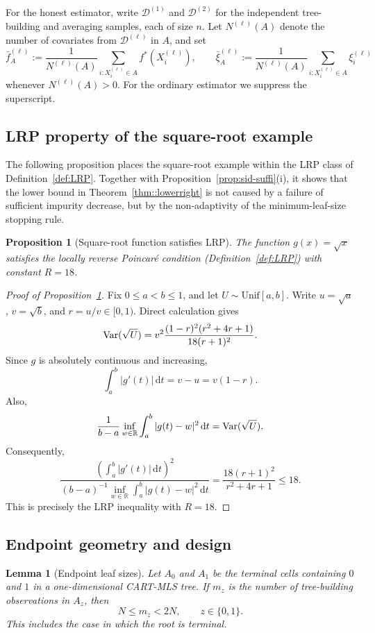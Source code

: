 \documentclass[11pt]{article}
\theoremstyle{plain}
\newtheorem{lemma}[theorem]{Lemma}
\newtheorem{proposition}[theorem]{Proposition}
\theoremstyle{definition}
\theoremstyle{remark}
\theoremstyle{plain}
\newcommand{\Var}{\textnormal{Var}}
\newcommand{\1}{\mathbbm{1}}
\begin{document}
For the honest estimator, write $\mathcal D^{(1)}$ and $\mathcal D^{(2)}$
for the independent tree-building and averaging samples, each of size $n$.
Let $N^{(\ell)}(A)$ denote the number of covariates from
$\mathcal D^{(\ell)}$ in $A$, and set
\[
 \bar f_A^{(\ell)}
 :=
 \frac{1}{N^{(\ell)}(A)}
 \sum_{i:X_i^{(\ell)}\in A}f^*(X_i^{(\ell)}),
 \qquad
 \bar\xi_A^{(\ell)}
 :=
 \frac{1}{N^{(\ell)}(A)}
 \sum_{i:X_i^{(\ell)}\in A}\xi_i^{(\ell)}
\]
whenever $N^{(\ell)}(A)>0$. For the ordinary estimator we suppress the
superscript.


\subsection{LRP property of the square-root example}

The following proposition places the square-root example within the LRP class
of Definition~\ref{def:LRP}. Together with
Proposition~\ref{prop:sid-suffi}(i), it shows that the lower bound in
Theorem~\ref{thm::lowerright} is not caused by a failure of sufficient impurity
decrease, but by the non-adaptivity of the minimum-leaf-size stopping rule.

\begin{proposition}[Square-root function satisfies LRP]
\label{prop:sqrt-lrp}
The function $g(x)=\sqrt{x}$ satisfies the locally reverse Poincar\'e condition
(Definition~\ref{def:LRP}) with constant $R=18$.
\end{proposition}

\begin{proof}[Proof of Proposition~\ref{prop:sqrt-lrp}]
Fix $0\le a<b\le1$, and let $U\sim\mathrm{Unif}[a,b]$. Write
$u=\sqrt a$, $v=\sqrt b$, and $r=u/v\in[0,1)$. Direct calculation gives
\[
\Var(\sqrt U)
=
v^2\frac{(1-r)^2(r^2+4r+1)}{18(r+1)^2}.
\]
Since $g$ is absolutely continuous and increasing,
\[
\int_a^b|g'(t)|\,\mathrm dt=v-u=v(1-r).
\]
Also,
\[
\frac{1}{b-a}\inf_{w\in\mathbb R}
\int_a^b|g(t)-w|^2\,\mathrm dt
=\Var(\sqrt U).
\]
Consequently,
\[
\frac{
\left(\int_a^b|g'(t)|\,\mathrm dt\right)^2
}{
(b-a)^{-1}\inf_{w\in\mathbb R}
\int_a^b|g(t)-w|^2\,\mathrm dt
}
=
\frac{18(r+1)^2}{r^2+4r+1}
\le18.
\]
This is precisely the LRP inequality with $R=18$.
\end{proof}


\subsection{Endpoint geometry and design}


\begin{lemma}[Endpoint leaf sizes]
\label{lem:mls-endpoint-counts}
Let $A_0$ and $A_1$ be the terminal cells containing $0$ and $1$ in a
one-dimensional CART-MLS tree. If $m_z$ is the number of tree-building
observations in $A_z$, then
\[
 N\le m_z<2N,\qquad z\in\{0,1\}.
\]
This includes the case in which the root is terminal.
\end{lemma}
\end{document}
